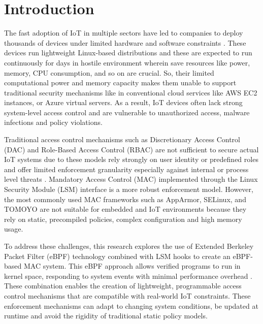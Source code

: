 
\section{Introduction}
\label{sec:Introduction}



The fast adoption of IoT in multiple sectors have led to companies to deploy thousands of devices under limited hardware and software constraints \citep{hossain2015towards}. These devices run lightweight Linux-based distributions and these are expected to run continuously for days in hostile environment wherein save resources like power, memory, CPU consumption, and so on are crucial.  So, their limited computational power and memory capacity makes them unable to support traditional security mechanisms like in conventional cloud services like AWS EC2 instances, or Azure virtual servers. As a result, IoT devices often lack strong system-level access control and are vulnerable to unauthorized access, malware infections and policy violations.

Traditional access control mechanisms such as Discretionary Access Control (DAC) and Role-Based Access Control (RBAC) are not sufficient to secure actual IoT systems due to these models rely strongly on user identity or predefined roles and offer limited enforcement granularity especially against internal or process level threats \citep{From_Conventional_to_State-of-the-Art_IoT_Access_Control_Models, Access_control_in_Internet-of-Things}. Mandatory Access Control (MAC) implemented through the Linux Security Module (LSM) interface is a more robust enforcement model. However, the most commonly used MAC frameworks such as AppArmor, SELinux, and TOMOYO are not suitable for embedded and IoT environments because they rely on static, precompiled policies, complex configuration and high memory usage.

To address these challenges, this research explores the use of Extended Berkeley Packet Filter (eBPF) technology combined  with LSM hooks to create an eBPF-based MAC system. This eBPF approach allows verified programs to run in kernel space,  responding to system events with minimal performance overhead \citep{eBPF_Pioneering_Kernel_Programmability_and_System_Observability-Past_Present_and_Future_Insights}. These combination enables the creation of lightweight, programmable access control mechanisms that are compatible with real-world IoT constraints. These enforcement mechanisms can adapt to changing system conditions, be updated at runtime and avoid the rigidity of traditional static policy models.

